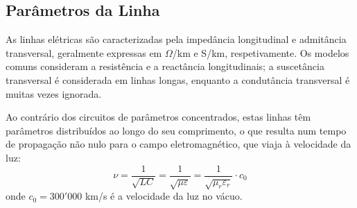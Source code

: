 \subsection{Parâmetros da Linha}

As linhas elétricas são caracterizadas pela impedância longitudinal e admitância transversal, geralmente expressas em $\Omega$/km e S/km, respetivamente. Os modelos comuns consideram a resistência e a reactância longitudinais; a suscetância transversal é considerada em linhas longas, enquanto a condutância transversal é muitas vezes ignorada. 

\begin{mdframed}
    Ao contrário dos circuitos de parâmetros concentrados, estas linhas têm parâmetros distribuídos ao longo do seu comprimento, o que resulta num tempo de propagação não nulo para o campo eletromagnético, que viaja à velocidade da luz:
    $$
        \nu = \frac{1}{\sqrt{LC}} = \frac{1}{\sqrt{\mu \varepsilon}} = \frac{1}{\sqrt{\mu_r \varepsilon_r}} \cdot c_0
    $$
    onde $c_0 = 300'000$ km/s é a velocidade da luz no vácuo.
\end{mdframed}

